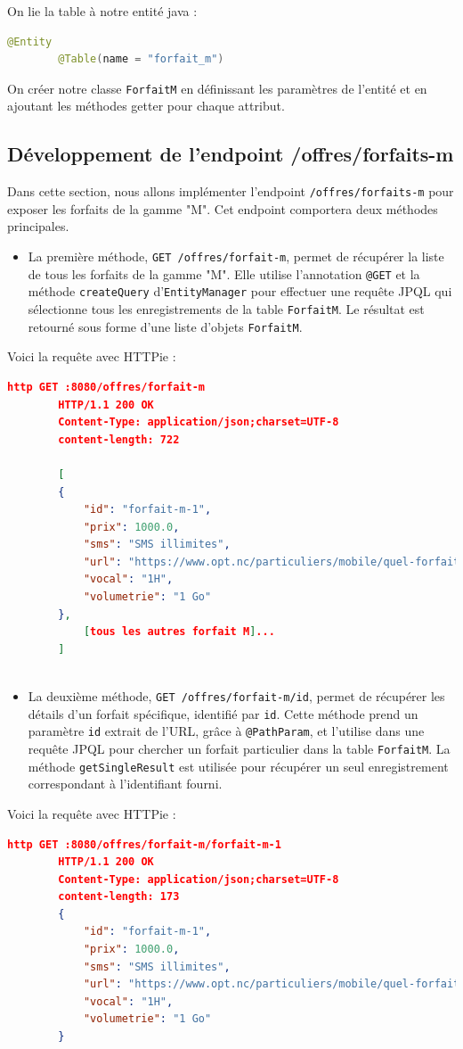 \documentclass{article}
\begin{document}
	On lie la table à notre entité java :
	\begin{lstlisting}[language=java]
		@Entity
		@Table(name = "forfait_m") 
	\end{lstlisting}
	
	On créer notre classe \texttt{ForfaitM} en définissant les paramètres de l'entité et en ajoutant les méthodes getter pour chaque attribut.
		
	\subsection{Développement de l'endpoint /offres/forfaits-m}
	\label{subsec:endpoint-m}
	Dans cette section, nous allons implémenter l'endpoint \texttt{/offres/forfaits-m} pour exposer les forfaits de la gamme "M". Cet endpoint comportera deux méthodes principales.
	
	\begin{itemize}
		\item La première méthode, \texttt{GET /offres/forfait-m}, permet de récupérer la liste de tous les forfaits de la gamme "M". 
		Elle utilise l'annotation \texttt{@GET} et la méthode \texttt{createQuery} d'\texttt{EntityManager} pour effectuer une requête JPQL qui sélectionne tous les enregistrements de la table \texttt{ForfaitM}. 
		Le résultat est retourné sous forme d'une liste d'objets \texttt{ForfaitM}.
	\end{itemize}
	
	Voici la requête avec HTTPie : 
	
	\begin{lstlisting}[language=json]
		http GET :8080/offres/forfait-m
		HTTP/1.1 200 OK
		Content-Type: application/json;charset=UTF-8
		content-length: 722
		
		[
		{
			"id": "forfait-m-1",
			"prix": 1000.0,
			"sms": "SMS illimites",
			"url": "https://www.opt.nc/particuliers/mobile/quel-forfait-choisir/forfait-m-1-go",
			"vocal": "1H",
			"volumetrie": "1 Go"
		},
			[tous les autres forfait M]...
		]
		
	\end{lstlisting}
	
	\begin{itemize}
		\item La deuxième méthode, \texttt{GET /offres/forfait-m/{id}}, permet de récupérer les détails d'un forfait spécifique, identifié par \texttt{id}. 
		Cette méthode prend un paramètre \texttt{id} extrait de l'URL, grâce à \texttt{@PathParam}, et l'utilise dans une requête JPQL pour chercher un forfait particulier dans la table \texttt{ForfaitM}. 
		La méthode \texttt{getSingleResult} est utilisée pour récupérer un seul enregistrement correspondant à l'identifiant fourni.
	\end{itemize}
	Voici la requête avec HTTPie :
	\begin{lstlisting}[language=json]
		http GET :8080/offres/forfait-m/forfait-m-1
		HTTP/1.1 200 OK
		Content-Type: application/json;charset=UTF-8
		content-length: 173
		{
			"id": "forfait-m-1",
			"prix": 1000.0,
			"sms": "SMS illimites",
			"url": "https://www.opt.nc/particuliers/mobile/quel-forfait-choisir/forfait-m-1-go",
			"vocal": "1H",
			"volumetrie": "1 Go"
		}
	\end{lstlisting}
\end{document}
